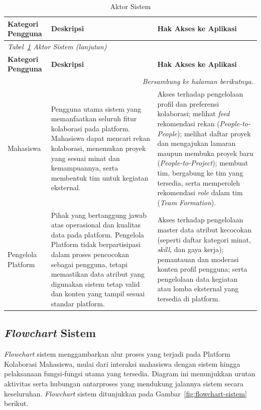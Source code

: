 \begin{longtable}{p{2.5cm} p{5cm} >{\raggedright\arraybackslash}p{\dimexpr\linewidth-7.5cm-6\tabcolsep\relax}}
  \caption{Aktor Sistem}
  \label{tab:aktor-sistem} \\
  \toprule
    \textbf{Kategori Pengguna} & \textbf{Deskripsi} & \textbf{Hak Akses ke Aplikasi} \\
  \midrule
  \endfirsthead
  \multicolumn{3}{l}{\small\textit{Tabel~\ref{tab:aktor-sistem} Aktor Sistem (lanjutan)}} \\
  \toprule
    \textbf{Kategori Pengguna} & \textbf{Deskripsi} & \textbf{Hak Akses ke Aplikasi} \\
  \midrule
  \endhead
  \bottomrule
  \multicolumn{3}{r}{\textit{Bersambung ke halaman berikutnya.}} \\
  \endfoot
  \bottomrule
  \endlastfoot
    Mahasiswa & Pengguna utama sistem yang memanfaatkan seluruh fitur kolaborasi pada platform. Mahasiswa dapat mencari rekan kolaborasi, menemukan proyek yang sesuai minat dan kemampuannya, serta membentuk tim untuk kegiatan eksternal. & Akses terhadap pengelolaan profil dan preferensi kolaborasi; melihat \emph{feed} rekomendasi rekan (\emph{People-to-People}); melihat daftar proyek dan mengajukan lamaran maupun membuka proyek baru (\emph{People-to-Project}); membuat tim, bergabung ke tim yang tersedia, serta memperoleh rekomendasi \emph{role} dalam tim (\emph{Team Formation}). \\
    \midrule
    Pengelola Platform & Pihak yang bertanggung jawab atas operasional dan kualitas data pada platform. Pengelola Platform tidak berpartisipasi dalam proses pencocokan sebagai pengguna, tetapi memastikan data atribut yang digunakan sistem tetap valid dan konten yang tampil sesuai standar platform. & Akses terhadap pengelolaan master data atribut kecocokan (seperti daftar kategori minat, \emph{skill}, dan gaya kerja); pemantauan dan moderasi konten profil pengguna; serta pengelolaan data kegiatan atau lomba eksternal yang tersedia di platform. \\
\end{longtable}

\subsection{\emph{Flowchart} Sistem}

\emph{Flowchart} sistem menggambarkan alur proses yang terjadi pada Platform Kolaborasi Mahasiswa, mulai dari interaksi mahasiswa dengan sistem hingga pelaksanaan fungsi-fungsi utama yang tersedia. Diagram ini menunjukkan urutan aktivitas serta hubungan antarproses yang mendukung jalannya sistem secara keseluruhan. \emph{Flowchart} sistem ditunjukkan pada Gambar~\ref{fig:flowchart-sistem} berikut.

